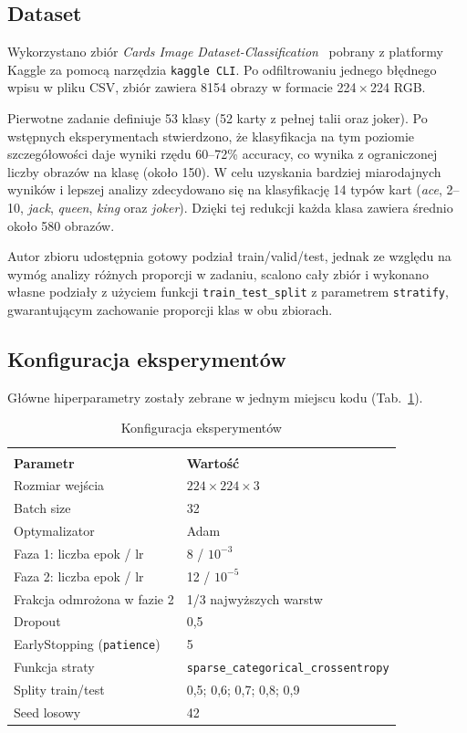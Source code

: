 \documentclass[12pt]{article}
\begin{document}
\subsection{Dataset}

Wykorzystano zbiór \emph{Cards Image Dataset-Classification}~\cite{cards_dataset} pobrany z platformy Kaggle za pomocą narzędzia \texttt{kaggle CLI}. Po odfiltrowaniu jednego błędnego wpisu w pliku CSV, zbiór zawiera 8154 obrazy w formacie 224\,$\times$\,224 RGB.

Pierwotne zadanie definiuje 53 klasy (52 karty z pełnej talii oraz joker). Po wstępnych eksperymentach stwierdzono, że klasyfikacja na tym poziomie szczegółowości daje wyniki rzędu 60--72\% accuracy, co wynika z ograniczonej liczby obrazów na klasę (około 150). W celu uzyskania bardziej miarodajnych wyników i lepszej analizy zdecydowano się na klasyfikację 14 typów kart (\textit{ace}, 2--10, \textit{jack}, \textit{queen}, \textit{king} oraz \textit{joker}). Dzięki tej redukcji każda klasa zawiera średnio około 580 obrazów.

Autor zbioru udostępnia gotowy podział train/valid/test, jednak ze względu na wymóg analizy różnych proporcji w zadaniu, scalono cały zbiór i wykonano własne podziały z użyciem funkcji \texttt{train\_test\_split} z parametrem \texttt{stratify}, gwarantującym zachowanie proporcji klas w obu zbiorach.

\subsection{Konfiguracja eksperymentów}

Główne hiperparametry zostały zebrane w jednym miejscu kodu (Tab.~\ref{tab:hyperparams}).

\begin{table}[h!]
  \caption{Konfiguracja eksperymentów}
  \centering
  \vspace{0.2cm}
  \begin{tabular}{l l}
    \hline\hline\\[-0.4cm]
    \textbf{Parametr} & \textbf{Wartość}\\[0.1cm]
    \hline
    Rozmiar wejścia & $224 \times 224 \times 3$\\
    Batch size & 32\\
    Optymalizator & Adam\\
    Faza 1: liczba epok / lr & 8 / $10^{-3}$\\
    Faza 2: liczba epok / lr & 12 / $10^{-5}$\\
    Frakcja odmrożona w fazie 2 & 1/3 najwyższych warstw\\
    Dropout & 0{,}5\\
    EarlyStopping (\texttt{patience}) & 5\\
    Funkcja straty & \texttt{sparse\_categorical\_crossentropy}\\
    Splity train/test & 0{,}5; 0{,}6; 0{,}7; 0{,}8; 0{,}9\\
    Seed losowy & 42\\
    [0.1cm]
    \hline
  \end{tabular}
  \label{tab:hyperparams}
\end{table}
\end{document}
